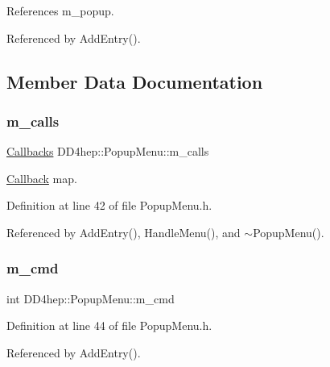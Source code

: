 References m\+\_\+popup.



Referenced by Add\+Entry().



\subsection{Member Data Documentation}
\hypertarget{class_d_d4hep_1_1_popup_menu_a19b33a5d34c5fca703a9e5f6946f5e10}{}\label{class_d_d4hep_1_1_popup_menu_a19b33a5d34c5fca703a9e5f6946f5e10} 
\subsubsection{\texorpdfstring{m\+\_\+calls}{m\_calls}}
{\footnotesize\ttfamily \hyperlink{class_d_d4hep_1_1_popup_menu_aea53283ce44fa4935d8b7a3751ad1b5b}{Callbacks} D\+D4hep\+::\+Popup\+Menu\+::m\+\_\+calls\hspace{0.3cm}{\ttfamily [protected]}}



\hyperlink{class_d_d4hep_1_1_callback}{Callback} map. 



Definition at line 42 of file Popup\+Menu.\+h.



Referenced by Add\+Entry(), Handle\+Menu(), and $\sim$\+Popup\+Menu().

\hypertarget{class_d_d4hep_1_1_popup_menu_ad631ad62359a2754913630d248967f71}{}\label{class_d_d4hep_1_1_popup_menu_ad631ad62359a2754913630d248967f71} 
\subsubsection{\texorpdfstring{m\+\_\+cmd}{m\_cmd}}
{\footnotesize\ttfamily int D\+D4hep\+::\+Popup\+Menu\+::m\+\_\+cmd\hspace{0.3cm}{\ttfamily [protected]}}



Definition at line 44 of file Popup\+Menu.\+h.



Referenced by Add\+Entry().

